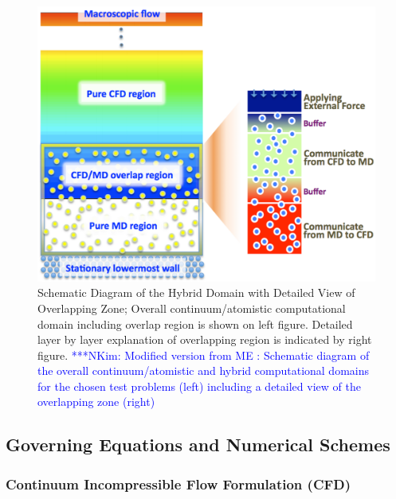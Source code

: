 \documentclass[preprint,12pt]{elsarticle}
\newcommand{\Nkimnote}[1]{ {\textcolor{blue} { ***NKim: #1 }}}
\newcommand{\Nkimnote}[1]{}
\begin{document}
\begin{figure}
\centering
\includegraphics[width=0.8\linewidth]{Hybrid_Schematic.pdf}
\vskip-0.2cm
\caption{\small Schematic Diagram of the Hybrid Domain with Detailed View of Overlapping Zone; Overall continuum/atomistic computational domain including overlap region is shown on left figure. Detailed layer by layer explanation of overlapping region is indicated by right figure.
\Nkimnote{Modified version from ME :
Schematic diagram of the overall continuum/atomistic and hybrid computational domains for the chosen test problems (left) including a detailed view of the overlapping zone (right)}
}
\label{Fig:Couette}
\vspace{-1em}
\end{figure}



\subsection{Governing Equations and Numerical Schemes}

\subsubsection{Continuum Incompressible Flow Formulation (CFD)}
\end{document}

